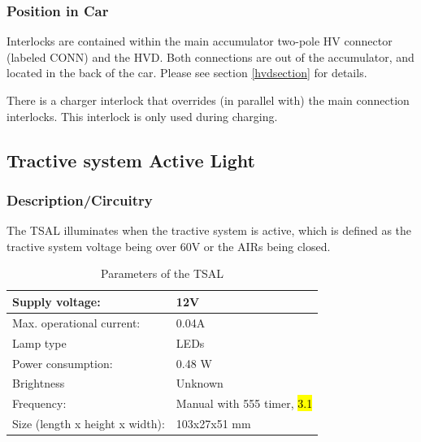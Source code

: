 \documentclass{article}
\DeclareRobustCommand{\hlr}[1]{{\sethlcolor{red}\hl{#1}}}
\begin{document}

        \subsubsection{Position in Car}

            Interlocks are contained within the main accumulator two-pole HV connector (labeled CONN) and the HVD. Both connections are out of the accumulator, and located in the back of the car. Please see section \ref{hvdsection} for details.

            There is a charger interlock that overrides (in parallel with) the main connection interlocks. This interlock is only used during charging.

    \subsection{Tractive system Active Light}

        \subsubsection{Description/Circuitry}


            The TSAL illuminates when the tractive system is active, which is defined as the tractive system voltage being over 60V or the AIRs being closed.


            \begin{table}[H]
                \centering
                \begin{tabular}{|l|l|}
                \hline
                Supply voltage: & 12V \\ \hline
                Max. operational current: &  0.04A\\ \hline
                Lamp type & LEDs \\ \hline
                Power consumption: & 0.48 W\\ \hline
                Brightness & Unknown \\ \hline
                Frequency: & Manual with 555 timer, \hlr{3.1} \\ \hline
                Size (length x height x width): & 103x27x51 mm \\ \hline
                \end{tabular}
                \caption{Parameters of the TSAL}
                \label{TSALparameters}
            \end{table}
\end{document}
